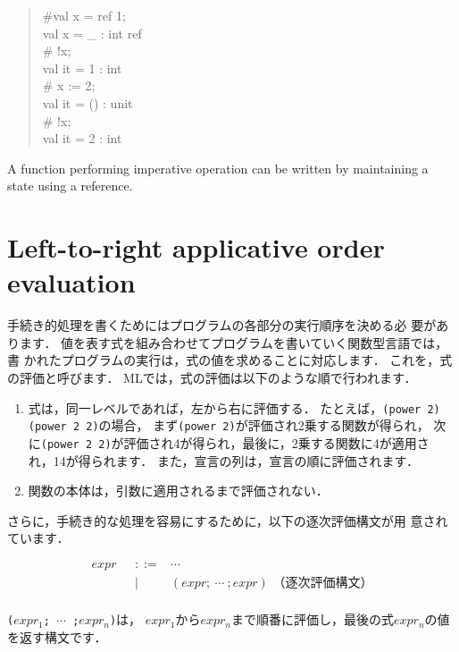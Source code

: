 \documentclass{jbook}
\newcommand{\txt}[2]{#2}
\newcommand{\vbar}{\mbox{\ $|$\ }}
\begin{document}
\begin{tt}
\begin{quote}
\#val x = ref 1;\\
val x = \_ : int ref\\
\# !x;\\
val it = 1 : int\\
\# x := 2;\\
val it = () : unit\\
\# !x;\\
val it = 2 : int
\end{quote}
\end{tt}
	A function performing imperative operation can be written by
maintaining a state using a reference.
\fi%

\section{
\txt{作用順，左から右への評価戦略}
    {Left-to-right applicative order evaluation}
}
\label{sec:tutorialEvalorder}

\ifjp%
	手続き的処理を書くためにはプログラムの各部分の実行順序を決める必
要があります．
	値を表す式を組み合わせてプログラムを書いていく関数型言語では，書
かれたプログラムの実行は，式の値を求めることに対応します．
	これを，式の評価と呼びます．
	MLでは，式の評価は以下のような順で行われます．
\begin{enumerate}
\item 式は，同一レベルであれば，左から右に評価する．
	たとえば，{\tt (power 2) (power 2 2)}の場合，
まず{\tt (power 2)}が評価され2乗する関数が得られ，
次に{\tt (power 2 2)}が評価され4が得られ，最後に，2乗する関数に4が適用さ
れ，14が得られます．
	また，宣言の列は，宣言の順に評価されます．
\item 関数の本体は，引数に適用されるまで評価されない．
\end{enumerate}
	さらに，手続き的な処理を容易にするために，以下の逐次評価構文が用
意されています．
\begin{tt}
\begin{eqnarray*}
expr &\mbox{\ \ }::=& \cdots\\
     &\vbar& (expr;{\ }\cdots{\ };expr)   \mbox{\ \ \ \ （逐次評価構文）} \\
\end{eqnarray*}
\end{tt}
{\tt ($expr_1$;{\ }$\cdots${\ };$expr_n$)}は，
$expr_1$から$expr_n$まで順番に評価し，最後の式$expr_n$の値を返す構文です．
\end{document}
